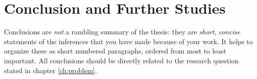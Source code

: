 \chapter{Conclusion and Further Studies}
\label{ch:conclusion}

Conclusions are \textit{not} a rambling summary of the thesis: they are
\textit{short}, \textit{concise} statements of the inferences that you have made
because of your work. It helps to organize these as short numbered paragraphs,
ordered from most to least important. All conclusions should be directly related
to the research question stated in chapter \ref{ch:problem}.